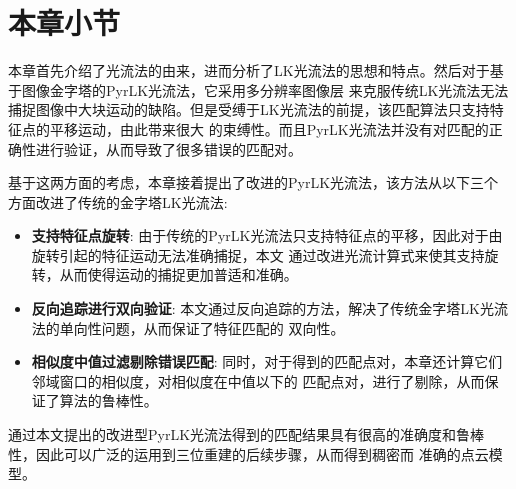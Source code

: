 \section{本章小节}
\label{sec:conclusion}
本章首先介绍了光流法的由来，进而分析了LK光流法的思想和特点。然后对于基于图像金字塔的PyrLK光流法，它采用多分辨率图像层
来克服传统LK光流法无法捕捉图像中大块运动的缺陷。但是受缚于LK光流法的前提，该匹配算法只支持特征点的平移运动，由此带来很大
的束缚性。而且PyrLK光流法并没有对匹配的正确性进行验证，从而导致了很多错误的匹配对。

基于这两方面的考虑，本章接着提出了改进的PyrLK光流法，该方法从以下三个方面改进了传统的金字塔LK光流法:\\
\begin{itemize}
	\item \textbf{支持特征点旋转}: 由于传统的PyrLK光流法只支持特征点的平移，因此对于由旋转引起的特征运动无法准确捕捉，本文
		通过改进光流计算式来使其支持旋转，从而使得运动的捕捉更加普适和准确。
	\item \textbf{反向追踪进行双向验证}: 本文通过反向追踪的方法，解决了传统金字塔LK光流法的单向性问题，从而保证了特征匹配的
		双向性。
	\item \textbf{相似度中值过滤剔除错误匹配}: 同时，对于得到的匹配点对，本章还计算它们邻域窗口的相似度，对相似度在中值以下的
		匹配点对，进行了剔除，从而保证了算法的鲁棒性。
\end{itemize}

通过本文提出的改进型PyrLK光流法得到的匹配结果具有很高的准确度和鲁棒性，因此可以广泛的运用到三位重建的后续步骤，从而得到稠密而
准确的点云模型。
